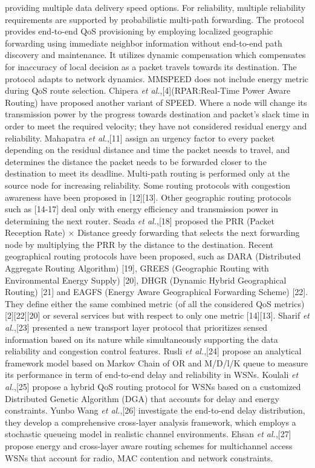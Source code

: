 \documentclass[fleqn,twoside]{article}
\begin{document}
providing multiple data delivery speed options. For reliability, multiple reliability requirements are supported by probabilistic multi-path forwarding. The protocol provides end-to-end QoS provisioning by employing localized geographic forwarding using immediate neighbor information without end-to-end path discovery and maintenance. It utilizes dynamic compensation which compensates for inaccuracy of local decision as a packet travels towards its destination. The protocol adapts to network dynamics. MMSPEED does not include energy metric during QoS route selection.  Chipera \emph{et al.},[4](RPAR:Real-Time Power Aware Routing) have proposed another variant of SPEED. Where a node will change its transmission power by the progress towards destination and packet's slack time in order to meet the required velocity; they have not considered residual energy and reliability. 
\vskip 2mm
Mahapatra \emph{et al.},[11] assign an urgency factor to every packet depending on the residual distance and time the packet neesds to travel, and determines the distance the packet needs to be forwarded closer to the destination to meet its deadline. Multi-path routing is performed only at the source node for increasing reliability. Some routing protocols with congestion awareness have been proposed in [12][13]. Other geographic routing protocols such as [14-17] deal only with energy efficiency
and transmission power in determining the next router. Seada \emph{et al.},[18] proposed the PRR (Packet Reception Rate) $\times$ Distance greedy forwarding 
that selects the next forwarding node by multiplying the PRR by the distance to the destination. Recent geographical routing protocols have been proposed, such as DARA (Distributed Aggregate Routing Algorithm) [19], GREES (Geographic Routing with Environmental Energy Supply) [20], DHGR (Dynamic Hybrid Geographical Routing) [21] and EAGFS (Energy Aware Geographical Forwarding Scheme) [22]. They define either the same combined metric (of all the considered QoS metrics) [2][22][20] or several services but with respect to only one metric [14][13].
\vskip 2mm
Sharif \emph{et al.},[23] presented a new transport layer protocol that prioritizes sensed information based on its nature while simultaneously supporting the data reliability and congestion control features. Rusli \emph{et al.},[24] propose an analytical framework model based on Markov Chain of OR and M/D/l/K queue to measure its performance in term of end-to-end delay and reliability in WSNs. 
Koulali \emph{et al.},[25] propose a hybrid QoS routing protocol for WSNs based on a customized Distributed Genetic Algorithm (DGA) that accounts for delay and energy constraints. Yunbo Wang \emph{et al.},[26] investigate the end-to-end delay distribution, they develop a comprehensive cross-layer analysis framework, which employs a stochastic queueing model in realistic channel environments. Ehsan \emph{et al.},[27] propose energy and cross-layer aware routing schemes for multichannel access WSNs that account for radio, MAC contention and network constraints.
\end{document}
